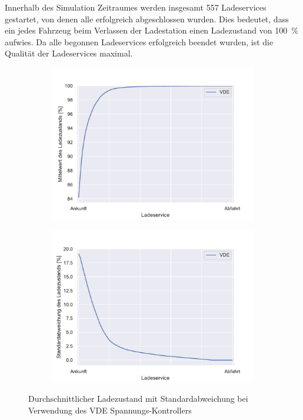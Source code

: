 Innerhalb des Simulation Zeitraumes werden insgesamt 557 Ladeservices gestartet, von denen alle erfolgreich abgeschlossen wurden. Dies bedeutet, dass ein jedes Fahrzeug beim Verlassen der Ladestation einen Ladezustand von 100~\% aufwies. Da alle begonnen Ladeservices erfolgreich beendet wurden, ist die Qualität der Ladeservices maximal.
\begin{figure}[h]
	\begin{subfigure}{0.49\linewidth}
		\includegraphics[width=\linewidth]{img/VDE_tau/tau_VDE_2_soc_mean.pdf}
        \label{ABB_VDEtauSocMEAN}
	\end{subfigure}
	\begin{subfigure}{0.49\linewidth}
		\includegraphics[width=\linewidth]{img/VDE_tau/tau_VDE_2_soc_std.pdf}
        \label{ABB_VDEtauSocSTD}
	\end{subfigure}
	\caption{Durchschnittlicher Ladezustand mit Standardabweichung bei Verwendung des VDE Spannungs-Kontrollers}
\end{figure}
